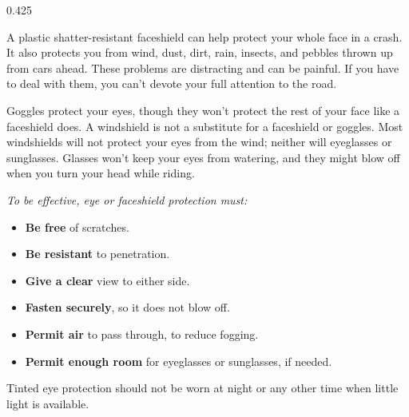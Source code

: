 \begin{langblock}{0.425} 
	\begin{eng}
	A plastic shatter-resistant faceshield can help protect your whole face in a crash. It also protects you from wind, dust, dirt, rain, insects, and pebbles thrown up from cars ahead. These problems are distracting and can be painful. If you have to deal with them, you can't devote your full attention to the road.
	
	Goggles protect your eyes, though they won't protect the rest of your face like a faceshield does. A windshield is not a substitute for a faceshield or goggles. Most windshields will not protect your eyes from the wind; neither will eyeglasses or sunglasses. Glasses won't keep your eyes from watering, and they might blow off when you turn your head while riding.
	
	\textit{To be effective, eye or faceshield protection must:}
	\begin{itemize}[noitemsep]
		\item \textbf{Be free} of scratches.
		\item \textbf{Be resistant} to penetration.
		\item \textbf{Give a clear} view to either side.
		\item \textbf{Fasten securely}, so it does not blow off.
		\item \textbf{Permit air} to pass through, to reduce fogging.
		\item \textbf{Permit enough room} for eyeglasses or sunglasses, if needed.
	\end{itemize}
	Tinted eye protection should not be worn at night or any other time when little light is available.
	

\end{eng}
\end{langblock}
